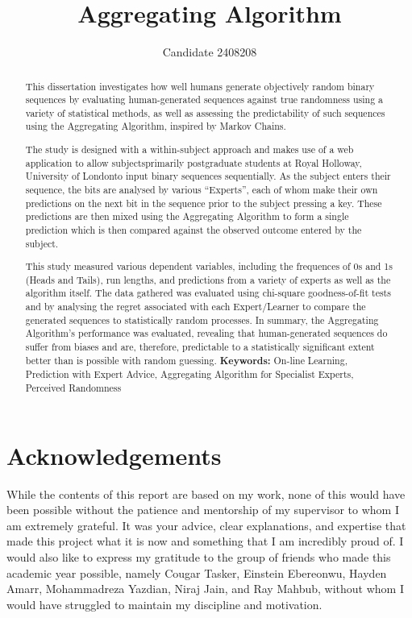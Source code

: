 \documentclass[11pt]{article} %
\title{Aggregating Algorithm}
\author{Candidate 2408208}
\theoremstyle{plain}
\theoremstyle{definition}
\begin{document}
\maketitle

\declaration{}

\begin{abstract}
  This dissertation investigates how well humans generate objectively random binary sequences by evaluating human-generated sequences against true randomness using a variety of statistical methods, as well as assessing the predictability of such sequences using the Aggregating Algorithm, inspired by Markov Chains.
  
  The study is designed with a within-subject approach and makes use of a web application to allow subjects\textemdash{}primarily postgraduate students at Royal Holloway, University of London\textemdash{}to input binary sequences sequentially. As the subject enters their sequence, the bits are analysed by various ``Experts'', each of whom make their own predictions on the next bit in the sequence prior to the subject pressing a key. These predictions are then mixed using the Aggregating Algorithm to form a single prediction which is then compared against the observed outcome entered by the subject.
  
  This study measured various dependent variables, including the frequences of 0s and 1s (Heads and Tails), run lengths, and predictions from a variety of experts as well as the algorithm itself. The data gathered was evaluated using chi-square goodness-of-fit tests and by analysing the regret associated with each Expert/Learner to compare the generated sequences to statistically random processes. In summary, the Aggregating Algorithm's performance was evaluated, revealing that human-generated sequences do suffer from biases and are, therefore, predictable to a statistically significant extent better than is possible with random guessing.\newline\newline
  \textbf{Keywords:} On-line Learning, Prediction with Expert Advice, Aggregating Algorithm for Specialist Experts, Perceived Randomness
\end{abstract}

\section*{Acknowledgements}
While the contents of this report are based on my work, none of this would have been possible without the patience and mentorship of my supervisor to whom I am extremely grateful. It was your advice, clear explanations, and expertise that made this project what it is now and something that I am incredibly proud of.
I would also like to express my gratitude to the group of friends who made this academic year possible, namely Cougar Tasker, Einstein Ebereonwu, Hayden Amarr, Mohammadreza Yazdian, Niraj Jain, and Ray Mahbub, without whom I would have struggled to maintain my discipline and motivation.
\newpage
\end{document}
